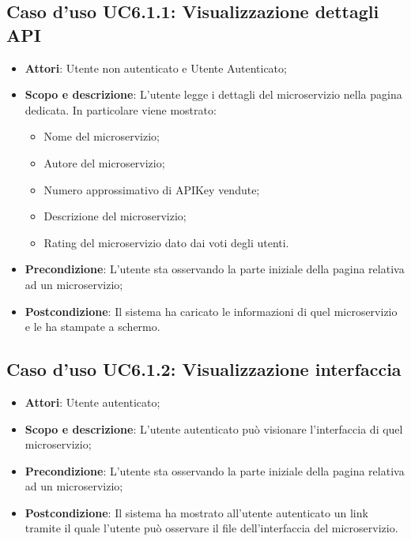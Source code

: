 \documentclass[12pt,a4paper,titlepage]{article}
\begin{document}
	\subsection{Caso d'uso UC6.1.1: Visualizzazione dettagli API}
	\label{UC6.1.1}
	\begin{itemize}
		\item \textbf{Attori}: Utente non autenticato e Utente Autenticato;
		\item \textbf{Scopo e descrizione}: L'utente legge i dettagli del microservizio nella pagina dedicata. In particolare viene mostrato:
		\begin{itemize}
			\item Nome del microservizio;
			\item Autore del microservizio;
			\item Numero approssimativo di APIKey vendute;
			\item Descrizione del microservizio;
			\item Rating del microservizio dato dai voti degli utenti.
		\end{itemize}
		\item \textbf{Precondizione}: L'utente sta osservando la parte iniziale della pagina relativa ad un microservizio;
		\item \textbf{Postcondizione}: Il sistema ha caricato le informazioni di quel microservizio e le ha stampate a schermo.
	\end{itemize}
	\subsection{Caso d'uso UC6.1.2: Visualizzazione interfaccia}
	\label{UC6.1.2}
	\begin{itemize}
		\item \textbf{Attori}: Utente autenticato;
		\item \textbf{Scopo e descrizione}: L'utente autenticato può visionare l'interfaccia di quel microservizio;
		\item \textbf{Precondizione}: L'utente sta osservando la parte iniziale della pagina relativa ad un microservizio;
		\item \textbf{Postcondizione}: Il sistema ha mostrato all'utente autenticato un link tramite il quale l'utente può osservare il file dell'interfaccia del microservizio.
	\end{itemize}
\end{document}
